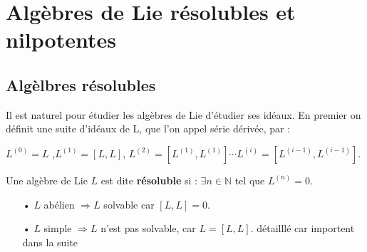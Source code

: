 \documentclass[a4paper,openany,12pt]{report}
\newcommand{\NN}{\mathbb{N}}
\theoremstyle{break}
{\theorembodyfont{\upshape}
\newtheorem*{rmq}{Remarque :}
\newtheorem*{prv}{Preuve :}
\newtheorem*{ex}{Exemples :}
\newtheorem{exe}{Exemple : }
\newtheorem*{nota}{Notation :}}
\begin{document}

\section{Algèbres de Lie résolubles et nilpotentes}

\subsection{Algèlbres résolubles}

\quad Il est naturel pour étudier les algèbres de Lie d'étudier ses idéaux. En premier on définit une suite d'idéaux de L, que l'on appel série dérivée, par :
\begin{center}
$L^{(0)} = L$ ,$L^{(1)} = [L,L]$, $L^{(2)} = [L^{(1)},L^{(1)}] \cdots L^{(i)} = [L^{(i-1)},L^{(i-1)}]$.
\end{center}

\begin{df}
\quad Une algèbre de Lie $L$ est dite \textbf{résoluble} si : $\exists n \in \NN $ tel que $L^{(n)}=0$.
\end{df}

\begin{rmq}
\begin{itemize}
\item[•]  $L$ abélien $\Rightarrow L$ solvable car $[L,L] = 0$.
\item[•]  $L$ simple $\Rightarrow L$ n'est pas solvable, car $L = [L,L]$.
détailllé car importent dans la suite
\end{itemize}
\end{rmq}
\end{document}
